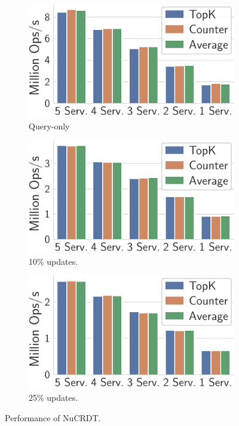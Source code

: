 \documentclass[sigplan,twocolumn,review,anonymous]{acmart}
\begin{document}
\begin{figure}
	\centering
	\begin{subfigure}{.325\linewidth}
		\includegraphics[width=1\linewidth]{singleQuery/n_servers_0_upd_5b}
	\vspace*{-10pt}
		\caption{Query-only}
		\label{fig:crdts_0_upd}
	\end{subfigure}%
	\begin{subfigure}{.325\linewidth}
		\includegraphics[width=1\linewidth]{singleQuery/n_servers_0_1_upd_5b}
	\vspace*{-10pt}
		\caption{10\% updates.}
		\label{fig:crdts_10_upd}
	\end{subfigure}%
	\begin{subfigure}{.34\linewidth}
	\includegraphics[width=1\linewidth]{singleQuery/n_servers_0_25_upd_5b}
	\vspace*{-10pt}
	\caption{25\% updates.}
	\label{fig:crdts_25-upd}
	\end{subfigure}%
	\vspace*{-10pt}
	\caption{Performance of NuCRDT.}
	\label{fig:crdts:perf}
	\vspace*{-15pt}
\end{figure}
\end{document}
